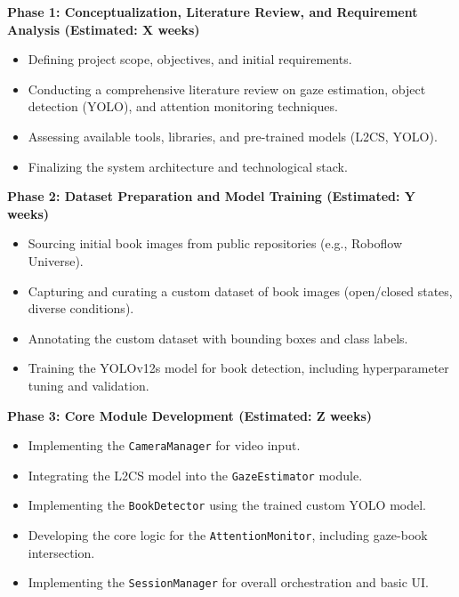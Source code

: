 \begin{description}
    \item \textbf{Phase 1: Conceptualization, Literature Review, and Requirement Analysis (Estimated: X weeks)}
    \begin{itemize}
        \item Defining project scope, objectives, and initial requirements.
        \item Conducting a comprehensive literature review on gaze estimation, object detection (YOLO), and attention monitoring techniques.
        \item Assessing available tools, libraries, and pre-trained models (L2CS, YOLO).
        \item Finalizing the system architecture and technological stack.
    \end{itemize}

    \item \textbf{Phase 2: Dataset Preparation and Model Training (Estimated: Y weeks)}
    \begin{itemize}
        \item Sourcing initial book images from public repositories (e.g., Roboflow Universe).
        \item Capturing and curating a custom dataset of book images (open/closed states, diverse conditions).
        \item Annotating the custom dataset with bounding boxes and class labels.
        \item Training the YOLOv12s model for book detection, including hyperparameter tuning and validation.
    \end{itemize}

    \item \textbf{Phase 3: Core Module Development (Estimated: Z weeks)}
    \begin{itemize}
        \item Implementing the \texttt{CameraManager} for video input.
        \item Integrating the L2CS model into the \texttt{GazeEstimator} module.
        \item Implementing the \texttt{BookDetector} using the trained custom YOLO model.
        \item Developing the core logic for the \texttt{AttentionMonitor}, including gaze-book intersection.
        \item Implementing the \texttt{SessionManager} for overall orchestration and basic UI.
    \end{itemize}


\end{description}
